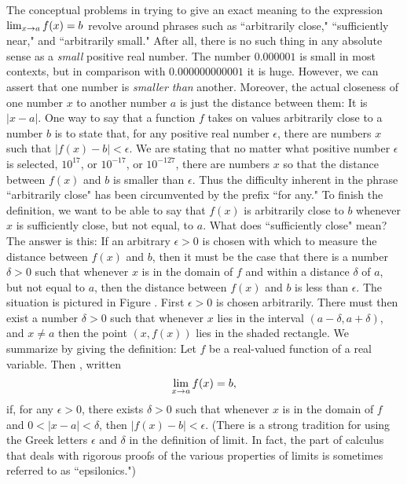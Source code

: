 The conceptual problems
in trying to give an exact meaning
to the expression
$\lim_{x \rightarrow a}f(x) = b$
revolve around phrases such as
``arbitrarily close,"
``sufficiently near,"
and ``arbitrarily small."
After all,
there is no such thing in any absolute sense
as a \emph{small} positive real number.
The number  $0.000001$
is small in most contexts,
but in comparison with  $0.000000000001$
it is huge.
However, we can assert that one number is
\emph{smaller than} another.
Moreover,
the actual closeness of one number $x$
to another number $a$
is just the distance between them:
It is $|x - a|$.
One way to say that a function $f$ takes on values
arbitrarily close to a number $b$
is to state that,
for any positive real number $\epsilon$,
there are numbers $x$ such that $|f(x) - b| < \epsilon$.
We are stating that
no matter what positive number $\epsilon$ is selected,
$10^{17}$, or $10^{-17}$, or $10^{-127}$,
there are numbers $x$ so that the distance between $f(x)$ and $b$
is smaller than $\epsilon$.
Thus the difficulty inherent in the phrase ``arbitrarily close"
has been circumvented by the prefix ``for any."
To finish the definition,
we want to be able to say that
$f(x)$ is arbitrarily close to $b$
whenever $x$ is sufficiently close,
but not equal, to $a$.
What does ``sufficiently close" mean?
The answer is this:
If an arbitrary $\epsilon > 0$ is chosen
with which to measure the distance between $f(x)$ and $b$,
then it must be the case that
there is a number $\delta > 0$
such that whenever $x$ is in the domain of $f$
and within a distance $\delta$ of $a$,
but not equal to $a$,
then the distance between $f(x)$ and $b$
is less than $\epsilon$.
The situation is pictured in Figure .
First $\epsilon > 0$ is chosen arbitrarily.
There must then exist a number $\delta > 0$
such that whenever
$x$ lies in the interval $(a - \delta, a + \delta)$,
and $x \neq a$ then
the point $(x, f(x))$ lies in the shaded rectangle.
We summarize by giving the definition:
Let $f$ be a real-valued function of a real variable.
Then ,
written 
\[
\lim_{x \rightarrow a} {f(x)} = b,
\]
if, for any $\epsilon > 0$,
there exists $\delta > 0$
such that whenever $x$ is in the domain of $f$
and $0 < |x - a| < \delta$,
then $|f(x) - b| < \epsilon$.
(There is a strong tradition for using
the Greek letters $\epsilon$ and $\delta$
in the definition of limit.
In fact, the part of calculus
that deals with rigorous proofs of the various properties of limits
is sometimes referred to as ``epsilonics.")


